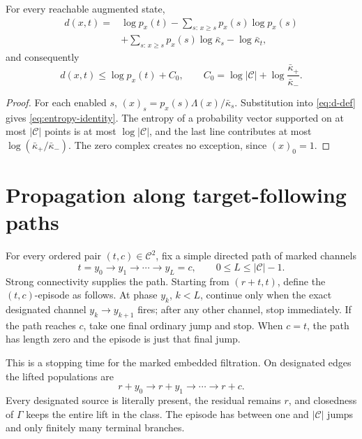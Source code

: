 \begin{lemma}\label{lem:entropy}
For every reachable augmented state,
\begin{equation}\label{eq:entropy-identity}
\begin{split}
  d(x,t)
  ={}&\log p_x(t)-\sum_{s:\,x\ge s} p_x(s)\log p_x(s)\\
    &+\sum_{s:\,x\ge s} p_x(s)\log\bar\kappa_s
      -\log\bar\kappa_t,
\end{split}
\end{equation}
and consequently
\begin{equation}\label{eq:entropy-bound}
  d(x,t)\le\log p_x(t)+C_0,
  \qquad
  C_0=\log|\mathcal C|+
  \log\frac{\bar\kappa_+}{\bar\kappa_-}.
\end{equation}
\end{lemma}

\begin{proof}
For each enabled \(s\),
\((x)_s=p_x(s)\Lambda(x)/\bar\kappa_s\).  Substitution into
\eqref{eq:d-def} gives \eqref{eq:entropy-identity}.  The entropy of a
probability vector supported on at most \(|\mathcal C|\) points is at most
\(\log|\mathcal C|\), and the last line contributes at most
\(\log(\bar\kappa_+/\bar\kappa_-)\).  The zero complex creates no exception,
since \((x)_0=1\).
\end{proof}

\section{Propagation along target-following paths}\label{sec:paths}

For every ordered pair \((t,c)\in\mathcal C^2\), fix a simple directed path
of marked channels
\begin{equation}\label{eq:path}
 t=y_0\longrightarrow y_1\longrightarrow\cdots
 \longrightarrow y_L=c,
 \qquad 0\le L\le|\mathcal C|-1.
\end{equation}
Strong connectivity supplies the path.  Starting from \((r+t,t)\), define
the \((t,c)\)-episode as follows.  At phase \(y_k\), \(k<L\), continue only
when the exact designated channel \(y_k\to y_{k+1}\) fires; after any other
channel, stop immediately.  If the path reaches \(c\), take one final
ordinary jump and stop.  When \(c=t\), the path has length zero and the
episode is just that final jump.

This is a stopping time for the marked embedded filtration.  On designated
edges the lifted populations are
\begin{equation}\label{eq:lift}
  r+y_0\longrightarrow r+y_1\longrightarrow\cdots\longrightarrow r+c.
\end{equation}
Every designated source is literally present, the residual remains \(r\),
and closedness of \(\Gamma\) keeps the entire lift in the class.  The episode
has between one and \(|\mathcal C|\) jumps and only finitely many terminal
branches.

